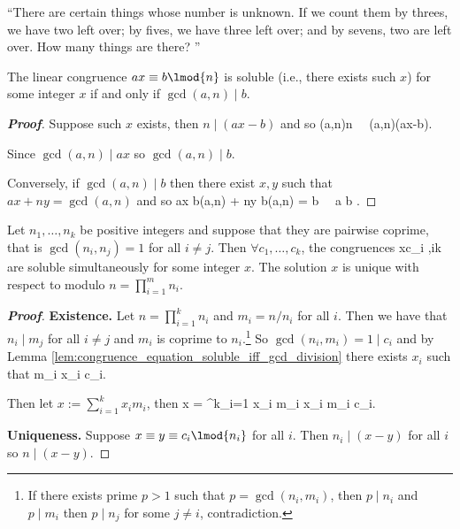 ``There are certain things whose number is unknown. If we count them by threes, we have two left over; by fives, we have three left over; and by sevens, two are left over. How many things are there? ''

\begin{lemma}\label{lem:congruence_equation_soluble_iff_gcd_division}
The linear congruence $ax\equiv b\lmod{n}$ is soluble (i.e., there exists such $x$) for some integer $x$ if and only if $\gcd(a,n)\mid b$.
\end{lemma}

\begin{proof}[\bf Proof]
Suppose such $x$ exists, then $n\mid (ax-b)$ and so 
\be
\gcd(a,n)\mid n \ \ra\ \gcd(a,n)\mid (ax-b).
\ee
 
Since $\gcd(a,n)\mid ax$ so $\gcd(a,n)\mid b$.

Conversely, if $\gcd(a,n)\mid b$ then there exist $x,y$ such that $ax + ny = \gcd(a,n)$ and so
\be
ax \frac b{\gcd(a,n)} + ny \frac b{\gcd(a,n)} = b \ \ra\ a \equiv b .
\ee
\end{proof}

\begin{theorem}\label{thm:chinese_remainder_number_theory}
Let $n_1,\dots,n_k$ be positive integers and suppose that they are pairwise coprime, that is $\gcd(n_i,n_j)=1$ for all $i\neq j$. Then $\forall c_1,\dots,c_k$, the congruences
\be
x\equiv c_i ,\leq i\leq k 
\ee
are soluble simultaneously for some integer $x$. The solution $x$ is unique with respect to modulo $n = \prod^m_{i=1} n_i$.
\end{theorem}

\begin{proof}[\bf Proof]
{\bf Existence.} Let $n = \prod^k_{i=1} n_i$ and $m_i = n/n_i$ for all $i$. Then we have that $n_i\mid m_j$ for all $i\neq j$ and $m_i$ is coprime to $n_i$.\footnote{If there exists prime $p>1$ such that $p = \gcd(n_i,m_i)$, then $p\mid n_i$ and $p\mid m_i$ then $p\mid n_j$ for some $j\neq i$, contradiction.} So $\gcd(n_i,m_i) = 1 \mid c_i$ and by Lemma \ref{lem:congruence_equation_soluble_iff_gcd_division} there exists $x_i$ such that 
\be
m_i x_i \equiv c_i.
\ee

Then let $x := \sum^k_{i=1} x_im_i$, then
\be
x = \sum^k_{i=1} x_i m_i \equiv x_i m_i \equiv c_i.
\ee

{\bf Uniqueness.} Suppose $x\equiv y \equiv c_i\lmod{n_i}$ for all $i$. Then $n_i\mid (x-y)$ for all $i$ so $n\mid (x-y)$.
\end{proof}

